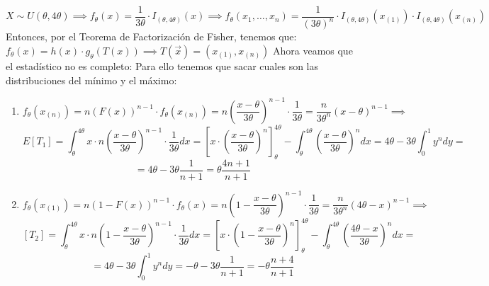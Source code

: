 \begin{sol}
	$$X \sim U(\theta, 4\theta) \implies f_{\theta}(x) = \frac{1}{3\theta} \cdot I_{(\theta, 4\theta)}(x) \implies f_{\theta}(x_1, \ldots, x_n) = \frac{1}{(3\theta)^n} \cdot I_{(\theta, 4\theta)}(x_{(1)}) \cdot I_{(\theta, 4\theta)}(x_{(n)})$$
	Entonces, por el Teorema de Factorización de Fisher, tenemos que: $f_{\theta}(x) = h(x) \cdot g_{\theta}(T(x)) \implies T(\vec{x}) = (x_{(1)}, x_{(n)})$ 
	Ahora veamos que el estadístico no es completo: 
	Para ello tenemos que sacar cuales son las distribuciones del mínimo y el máximo:
	\begin{enumerate}
		\item $$f_{\theta}(x_{(n)}) = n(F(x))^{n-1} \cdot f_{\theta}(x_{(n)}) = n\left(\frac{x - \theta}{3\theta}\right)^{n-1} \cdot \frac{1}{3\theta} = \frac{n}{3\theta^n}(x - \theta)^{n-1} \implies$$
		$$E[T_1] = \int_{\theta}^{4\theta}x \cdot n\left(\frac{x - \theta}{3\theta}\right)^{n-1} \cdot \frac{1}{3\theta}dx = \left[x\cdot \left(\frac{x - \theta}{3\theta}\right)^n\right]_{\theta}^{4\theta} - \int_{\theta}^{4\theta} \left(\frac{x - \theta}{3\theta}\right)^n dx = 4\theta - 3\theta\int_{0}^{1}y^n dy = $$ $$ = 4\theta - 3\theta\frac{1}{n+1} = \theta\frac{4n + 1}{n+1}$$
		\item $$f_{\theta}(x_{(1)}) = n(1 - F(x))^{n-1} \cdot f_{\theta}(x) = n\left(1 - \frac{x - \theta}{3\theta}\right)^{n-1} \cdot \frac{1}{3\theta} = \frac{n}{3\theta^n}(4\theta - x)^{n-1} \implies$$
		$$[T_2] = \int_{\theta}^{4\theta} x \cdot n\left(1 - \frac{x - \theta}{3\theta}\right)^{n-1} \cdot \frac{1}{3\theta}dx = \left[x\cdot \left(1 - \frac{x - \theta}{3\theta}\right)^n\right]_{\theta}^{4\theta} - \int_{\theta}^{4\theta} \left(\frac{4\theta - x}{3\theta}\right)^n dx = $$ $$ = 4\theta - 3\theta\int_{0}^{1}y^n dy = -\theta - 3\theta\frac{1}{n+1} = -\theta\frac{n + 4}{n+1}$$
	\end{enumerate} 
\end{sol}